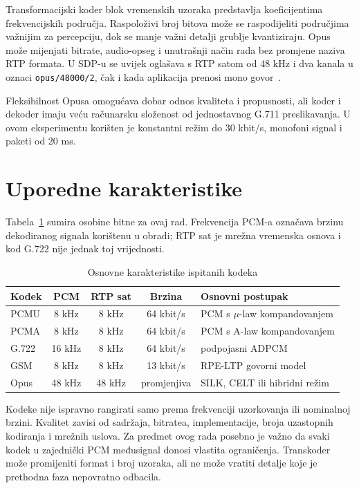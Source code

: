 Transformacijski koder blok vremenskih uzoraka predstavlja koeficijentima frekvencijskih područja. Raspoloživi broj bitova može se raspodijeliti područjima važnijim za percepciju, dok se manje važni detalji grublje kvantiziraju. Opus može mijenjati bitrate, audio-opseg i unutrašnji način rada bez promjene naziva RTP formata. U SDP-u se uvijek oglašava s RTP satom od 48 kHz i dva kanala u oznaci \texttt{opus/48000/2}, čak i kada aplikacija prenosi mono govor~\cite{rfc7587}.

Fleksibilnost Opusa omogućava dobar odnos kvaliteta i propusnosti, ali koder i dekoder imaju veću računarsku složenost od jednostavnog G.711 preslikavanja. U ovom eksperimentu korišten je konstantni režim do 30 kbit/s, monofoni signal i paketi od 20 ms.

\section{Uporedne karakteristike}

Tabela~\ref{tab:codec-overview} sumira osobine bitne za ovaj rad. Frekvencija PCM-a označava brzinu dekodiranog signala korištenu u obradi; RTP sat je mrežna vremenska osnova i kod G.722 nije jednak toj vrijednosti.

\begin{table}[htbp]
\centering
\caption{Osnovne karakteristike ispitanih kodeka}
\label{tab:codec-overview}
\small
\begin{tabularx}{\textwidth}{|l|c|c|c|X|}
\hline
\textbf{Kodek} & \textbf{PCM} & \textbf{RTP sat} & \textbf{Brzina} & \textbf{Osnovni postupak} \\
\hline
PCMU & 8 kHz & 8 kHz & 64 kbit/s & PCM s $\mu$-law kompandovanjem \\
PCMA & 8 kHz & 8 kHz & 64 kbit/s & PCM s A-law kompandovanjem \\
G.722 & 16 kHz & 8 kHz & 64 kbit/s & podpojasni ADPCM \\
GSM & 8 kHz & 8 kHz & 13 kbit/s & RPE-LTP govorni model \\
Opus & 48 kHz & 48 kHz & promjenjiva & SILK, CELT ili hibridni režim \\
\hline
\end{tabularx}
\end{table}

Kodeke nije ispravno rangirati samo prema frekvenciji uzorkovanja ili nominalnoj brzini. Kvalitet zavisi od sadržaja, bitratea, implementacije, broja uzastopnih kodiranja i mrežnih uslova. Za predmet ovog rada posebno je važno da svaki kodek u zajednički PCM međusignal donosi vlastita ograničenja. Transkoder može promijeniti format i broj uzoraka, ali ne može vratiti detalje koje je prethodna faza nepovratno odbacila.
